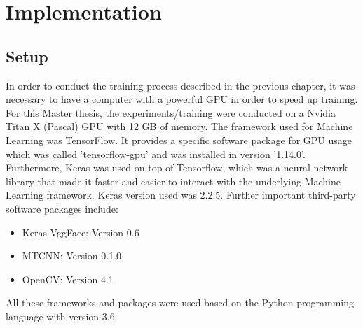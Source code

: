 \chapter{Implementation}
\section{Setup}

In order to conduct the training process described in the previous chapter, it was necessary to have a computer with a powerful GPU in order to speed up training. For this Master thesis, the experiments/training were conducted on a Nvidia Titan X (Pascal) GPU with 12 GB of memory. 
\newline\newline
The framework used for Machine Learning was TensorFlow. It provides a specific software package for GPU usage which was called 'tensorflow-gpu' and was installed in version '1.14.0'. Furthermore, Keras was used on top of Tensorflow, which was a neural network library that made it faster and easier to interact with the underlying Machine Learning framework. Keras version used was 2.2.5.
\newline\newline
Further important third-party software packages include:
\begin{itemize}
    \item Keras-VggFace: Version 0.6
    \item MTCNN:         Version 0.1.0
    \item OpenCV:        Version 4.1
\end{itemize}
All these frameworks and packages were used based on the Python programming language with version 3.6.


